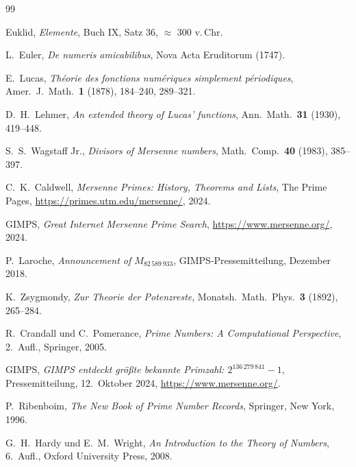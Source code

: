 \documentclass[12pt,a4paper]{amsart}
\theoremstyle{definition}
\theoremstyle{remark}
\begin{document}
\begin{thebibliography}{99}

Euklid,
\textit{Elemente},
Buch IX, Satz 36, $\approx$ 300 v.\,Chr.

L.\ Euler,
\textit{De numeris amicabilibus},
Nova Acta Eruditorum (1747).

E.\ Lucas,
\textit{Théorie des fonctions numériques simplement périodiques},
Amer.\ J.\ Math.\ \textbf{1} (1878), 184--240, 289--321.

D.\ H.\ Lehmer,
\textit{An extended theory of Lucas' functions},
Ann.\ Math.\ \textbf{31} (1930), 419--448.

S.\ S.\ Wagstaff Jr.,
\textit{Divisors of Mersenne numbers},
Math.\ Comp.\ \textbf{40} (1983), 385--397.

C.\ K.\ Caldwell,
\textit{Mersenne Primes: History, Theorems and Lists},
The Prime Pages, \url{https://primes.utm.edu/mersenne/}, 2024.

GIMPS,
\textit{Great Internet Mersenne Prime Search},
\url{https://www.mersenne.org/}, 2024.

P.\ Laroche,
\textit{Announcement of $M_{82\,589\,933}$},
GIMPS-Pressemitteilung, Dezember 2018.

K.\ Zsygmondy,
\textit{Zur Theorie der Potenzreste},
Monatsh.\ Math.\ Phys.\ \textbf{3} (1892), 265--284.

R.\ Crandall und C.\ Pomerance,
\textit{Prime Numbers: A Computational Perspective},
2.\ Aufl., Springer, 2005.

GIMPS,
\textit{GIMPS entdeckt größte bekannte Primzahl: $2^{136\,279\,841}-1$},
Pressemitteilung, 12.\ Oktober 2024,
\url{https://www.mersenne.org/}.

P.\ Ribenboim,
\textit{The New Book of Prime Number Records},
Springer, New York, 1996.

G.\ H.\ Hardy und E.\ M.\ Wright,
\textit{An Introduction to the Theory of Numbers},
6.\ Aufl., Oxford University Press, 2008.

\end{thebibliography}
\end{document}
